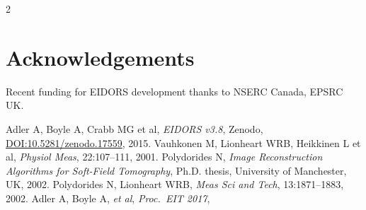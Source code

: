 \documentclass[10pt,letterpaper]{article}
\renewenvironment{thebibliography}[1]{%
    \begin{oldthebibliography}{#1}%
      \setlength{\parskip}{0ex}%
      \setlength{\itemsep}{0ex}%
  }%
  {%
    \end{oldthebibliography}%
  }
\begin{document}
\begin{multicols}{2}
\section*{Acknowledgements}
Recent funding for EIDORS development thanks to
NSERC Canada, EPSRC UK.

\footnotesize
\begin{thebibliography}{}
   Adler A, Boyle A, Crabb MG et al,
   {\em EIDORS v3.8}, Zenodo,
   \href{http://dx.doi.org/10.5281/zenodo.17559}{DOI:10.5281/zenodo.17559},
    2015.
   Vauhkonen M, Lionheart WRB, Heikkinen L et al,
   {\em  Physiol Meas}, 22:107--111, 2001.
   Polydorides N,
 {\em Image Reconstruction Algorithms for Soft-Field Tomography}, Ph.D. thesis,
   University of Manchester, UK, 2002.
   Polydorides N, Lionheart WRB,
   {\em Meas Sci and Tech}, 13:1871--1883, 2002.
   Adler A, Boyle A, {\em et al}, {\em Proc.\ EIT 2017}, 
\end{thebibliography}
\end{multicols}
\end{document}
